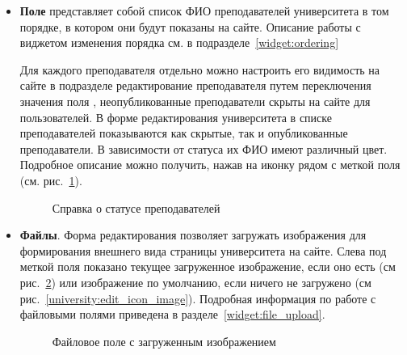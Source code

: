 \begin{itemize}
		\item \textbf{Поле } представляет собой список ФИО преподавателей университета в том порядке, в котором они будут показаны на сайте. Описание работы с виджетом изменения порядка см. в подразделе~\ref{widget:ordering}

		Для каждого преподавателя отдельно можно настроить его видимость на сайте в подразделе редактирование преподавателя путем переключения значения поля , неопубликованные преподаватели скрыты на сайте для пользователей. В форме редактирования университета в списке преподавателей показываются как скрытые, так и опубликованные преподаватели. В зависимости от статуса их ФИО имеют различный цвет. Подробное описание можно получить, нажав на иконку  рядом с меткой поля (см. рис.~\ref{university:edit_instructors_legend}).
		
		\begin{figure}[H]
		\caption{Справка о статусе преподавателей}
		\label{university:edit_instructors_legend}
		\end{figure}	
		
		\item \textbf{Файлы}. Форма редактирования позволяет загружать изображения для формирования внешнего вида страницы университета на сайте. Слева под меткой поля показано текущее загруженное изображение, если оно есть (см рис.~\ref{university:edit_logo}) или изображение по умолчанию, если ничего не загружено (см рис.~\ref{university:edit_icon_image}). Подробная информация по работе с файловыми полями приведена в разделе~\ref{widget:file_upload}.

		\begin{figure}[H]
		\caption{Файловое поле с загруженным изображением}
		\label{university:edit_logo}
		\end{figure}	
		

\end{itemize}
